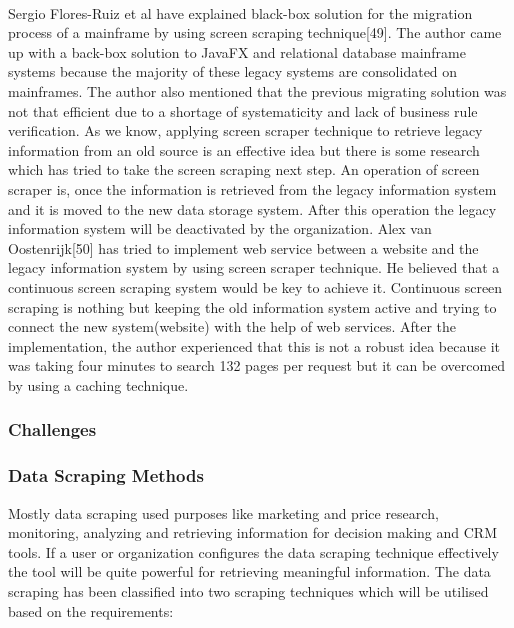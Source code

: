 \paragraph{}
Sergio Flores-Ruiz et al have explained black-box solution for the migration process of a mainframe by using screen scraping technique[49]. The author came up with a back-box solution to JavaFX and relational database mainframe systems because the majority of these legacy systems are consolidated on mainframes. The author also mentioned that the previous migrating solution was not that efficient due to a shortage of systematicity and lack of business rule verification. As we know, applying screen scraper technique to retrieve legacy information from an old source is an effective idea but there is some research which has tried to take the screen scraping next step. An operation of screen scraper is, once the information is retrieved from the legacy information system and it is moved to the new data storage system. After this operation the legacy information system will be deactivated by the organization. Alex van Oostenrijk[50] has tried to implement web service between a website and the legacy information system by using screen scraper technique. He believed that a continuous screen scraping system would be key to achieve it. Continuous screen scraping is nothing but keeping the old information system active and trying to connect the new system(website) with the help of web services. After the implementation, the author experienced that this is not a robust idea because it was taking four minutes to search 132 pages per request but it can be overcomed by using a caching technique.

\subsubsection{Challenges}

\subsubsection{Data Scraping Methods}
Mostly data scraping used purposes like marketing and price research, monitoring, analyzing and retrieving information for decision making and CRM tools. If a user or organization configures the data scraping technique effectively the tool will be quite powerful for retrieving meaningful information. The data scraping has been classified into two scraping techniques which will be utilised based on the requirements:

